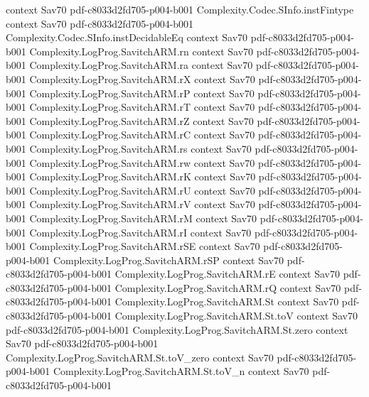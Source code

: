 \begin{theorem}
  {context}
  {Sav70}
  {pdf-c8033d2fd705-p004-b001}
\proofstep
  {Complexity.Codec.SInfo.instFintype}
  {context}
  {Sav70}
  {pdf-c8033d2fd705-p004-b001}
\proofstep
  {Complexity.Codec.SInfo.instDecidableEq}
  {context}
  {Sav70}
  {pdf-c8033d2fd705-p004-b001}
\proofstep
  {Complexity.LogProg.SavitchARM.rn}
  {context}
  {Sav70}
  {pdf-c8033d2fd705-p004-b001}
\proofstep
  {Complexity.LogProg.SavitchARM.ra}
  {context}
  {Sav70}
  {pdf-c8033d2fd705-p004-b001}
\proofstep
  {Complexity.LogProg.SavitchARM.rX}
  {context}
  {Sav70}
  {pdf-c8033d2fd705-p004-b001}
\proofstep
  {Complexity.LogProg.SavitchARM.rP}
  {context}
  {Sav70}
  {pdf-c8033d2fd705-p004-b001}
\proofstep
  {Complexity.LogProg.SavitchARM.rT}
  {context}
  {Sav70}
  {pdf-c8033d2fd705-p004-b001}
\proofstep
  {Complexity.LogProg.SavitchARM.rZ}
  {context}
  {Sav70}
  {pdf-c8033d2fd705-p004-b001}
\proofstep
  {Complexity.LogProg.SavitchARM.rC}
  {context}
  {Sav70}
  {pdf-c8033d2fd705-p004-b001}
\proofstep
  {Complexity.LogProg.SavitchARM.rs}
  {context}
  {Sav70}
  {pdf-c8033d2fd705-p004-b001}
\proofstep
  {Complexity.LogProg.SavitchARM.rw}
  {context}
  {Sav70}
  {pdf-c8033d2fd705-p004-b001}
\proofstep
  {Complexity.LogProg.SavitchARM.rK}
  {context}
  {Sav70}
  {pdf-c8033d2fd705-p004-b001}
\proofstep
  {Complexity.LogProg.SavitchARM.rU}
  {context}
  {Sav70}
  {pdf-c8033d2fd705-p004-b001}
\proofstep
  {Complexity.LogProg.SavitchARM.rV}
  {context}
  {Sav70}
  {pdf-c8033d2fd705-p004-b001}
\proofstep
  {Complexity.LogProg.SavitchARM.rM}
  {context}
  {Sav70}
  {pdf-c8033d2fd705-p004-b001}
\proofstep
  {Complexity.LogProg.SavitchARM.rI}
  {context}
  {Sav70}
  {pdf-c8033d2fd705-p004-b001}
\proofstep
  {Complexity.LogProg.SavitchARM.rSE}
  {context}
  {Sav70}
  {pdf-c8033d2fd705-p004-b001}
\proofstep
  {Complexity.LogProg.SavitchARM.rSP}
  {context}
  {Sav70}
  {pdf-c8033d2fd705-p004-b001}
\proofstep
  {Complexity.LogProg.SavitchARM.rE}
  {context}
  {Sav70}
  {pdf-c8033d2fd705-p004-b001}
\proofstep
  {Complexity.LogProg.SavitchARM.rQ}
  {context}
  {Sav70}
  {pdf-c8033d2fd705-p004-b001}
\proofstep
  {Complexity.LogProg.SavitchARM.St}
  {context}
  {Sav70}
  {pdf-c8033d2fd705-p004-b001}
\proofstep
  {Complexity.LogProg.SavitchARM.St.toV}
  {context}
  {Sav70}
  {pdf-c8033d2fd705-p004-b001}
\proofstep
  {Complexity.LogProg.SavitchARM.St.zero}
  {context}
  {Sav70}
  {pdf-c8033d2fd705-p004-b001}
\proofstep
  {Complexity.LogProg.SavitchARM.St.toV_zero}
  {context}
  {Sav70}
  {pdf-c8033d2fd705-p004-b001}
\proofstep
  {Complexity.LogProg.SavitchARM.St.toV_n}
  {context}
  {Sav70}
  {pdf-c8033d2fd705-p004-b001}

\end{theorem}

